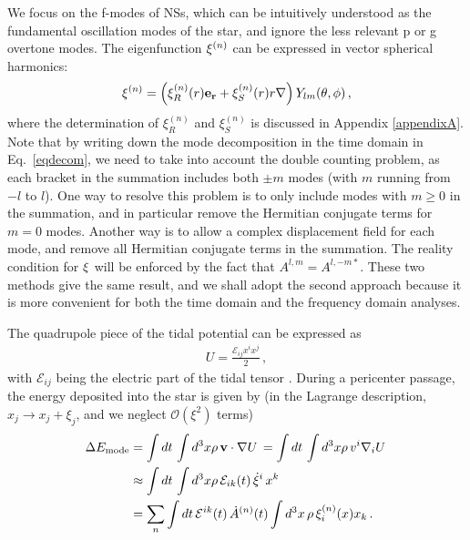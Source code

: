 \documentclass[prd,aps,floatfix,superscriptaddress,nofootinbib,twocolumn,10pt,English]{revtex4}
\begin{document}
We focus on the f-modes of NSs, which can be intuitively understood as the fundamental oscillation
modes of the star, and ignore the less relevant p or g overtone modes.
The eigenfunction ${\bf \xi}^{(n)}$ can be expressed in vector spherical harmonics:
\begin{align}\label{eqeigenwf} 
{\bf \xi}^{(n)} = \left ( \xi^{(n)}_R(r) {\bf
e_r}+\xi^{(n)}_S(r) r \nabla \right ) Y_{lm}(\theta,\phi)\,, 
\end{align} 
where the determination of $\xi^{(n)}_R$ and $\xi^{(n)}_S$ is
discussed in Appendix \ref{appendixA}. Note that by writing down the
mode decomposition in the time domain in Eq.~\eqref{eqdecom}, we need
to take into account the double counting problem, as each bracket in
the summation includes both $\pm m$ modes (with $m$ running from $-l$
to $l$). One way to resolve this problem is to only include modes
with $m\ge 0$ in the summation, and in particular remove the Hermitian
conjugate terms for $m=0$ modes. Another way is to allow a complex
displacement field for each mode, and remove all Hermitian conjugate
terms in the summation. The reality condition for ${\bf \xi}$ will be
enforced by the fact that $A^{l,m} =A^{l,-m *}$. These two methods
give the same result, and we shall adopt the second approach because
it is more convenient for both the time domain and the frequency
domain analyses.

The quadrupole piece of the tidal potential can be expressed as
\begin{align}
U = \frac{\mathcal{E}_{ij} x^i x^j}{2}\,,
\end{align}
with $\mathcal{E}_{ij}$ being the electric part of the tidal tensor \cite{poisson2010geometry,yang2017general}.
During a pericenter passage, the energy deposited into the star is given by \cite{press1977formation} (in the Lagrange description, $x_j \rightarrow x_j+\xi_j$, and we neglect $\mathcal{O}(\xi^2)$ terms)
\begin{align}\label{eqemode}
\Delta E_{\rm mode} & =\int dt\, \int d^3 x \rho \, {\bf v} \cdot \nabla U \,
  = \int dt\,\int d^3 x \rho \, v^i \nabla_i U \,\nonumber \\
&  \approx \int dt\,  \int d^3 x \rho \, \mathcal{E}_{ik}(t) \,\dot{\xi}^i\, x^k \nonumber \\
  & = \sum_n \int dt\, \mathcal{E}^{ik}(t)\, \dot{A}^{(n)}(t) \int d^3 x\, \rho\, \xi^{(n)}_i(x) x_k\,.
  \end{align}
\end{document}
